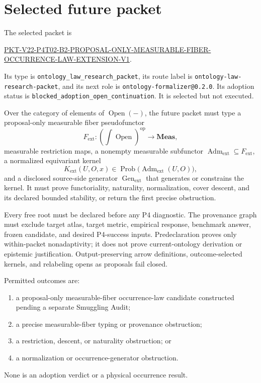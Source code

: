 \documentclass[11pt]{article}
\newcommand{\Open}{\operatorname{Open}}
\newcommand{\Prob}{\operatorname{Prob}}
\newcommand{\Adm}{\operatorname{Adm}}
\newcommand{\Fext}{F_{\mathrm{ext}}}
\newcommand{\Kext}{K_{\mathrm{ext}}}
\newcommand{\Genext}{\operatorname{Gen}_{\mathrm{ext}}}
\begin{document}
\section{Selected future packet}

The selected packet is
\begin{center}
\small
\url{PKT-V22-P4T02-B2-PROPOSAL-ONLY-MEASURABLE-FIBER-OCCURRENCE-LAW-EXTENSION-V1}.
\end{center}
Its type is \texttt{ontology\_law\_research\_packet}, its route label is
\texttt{ontology-law-research-packet}, and its next role is
\texttt{ontology-formalizer@0.2.0}. Its adoption status is
\texttt{blocked\_adoption\_open\_continuation}. It is selected but not
executed.

Over the category of elements of \(\Open(-)\), the future packet must type a
proposal-only measurable fiber pseudofunctor
\begin{equation}
  \Fext:\left(\int\Open\right)^{\mathrm{op}}\longrightarrow
  \mathbf{Meas},
\end{equation}
measurable restriction maps, a nonempty measurable subfunctor
\(\Adm_{\mathrm{ext}}\subseteq\Fext\), a normalized equivariant kernel
\begin{equation}
  \Kext(U,O,x)\in\Prob\bigl(\Adm_{\mathrm{ext}}(U,O)\bigr),
\end{equation}
and a disclosed source-side generator \(\Genext\) that generates or constrains
the kernel. It must prove functoriality, naturality, normalization, cover
descent, and its declared bounded stability, or return the first precise
obstruction.

Every free root must be declared before any P4 diagnostic. The provenance graph
must exclude target atlas, target metric, empirical response, benchmark answer,
frozen candidate, and desired P4-success inputs. Predeclaration proves only
within-packet nonadaptivity; it does not prove current-ontology derivation or
epistemic justification. Output-preserving arrow definitions, outcome-selected
kernels, and relabeling opens as proposals fail closed.

Permitted outcomes are:
\begin{enumerate}
  \item a proposal-only measurable-fiber occurrence-law candidate constructed
        pending a separate Smuggling Audit;
  \item a precise measurable-fiber typing or provenance obstruction;
  \item a restriction, descent, or naturality obstruction; or
  \item a normalization or occurrence-generator obstruction.
\end{enumerate}
None is an adoption verdict or a physical occurrence result.
\end{document}

